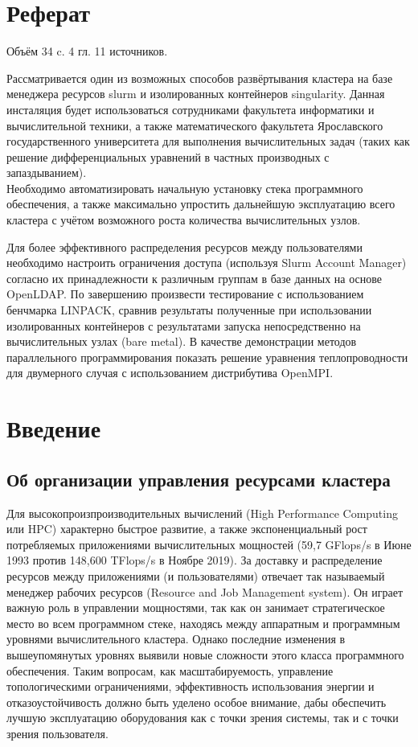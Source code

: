 \documentclass[a4paper]{extarticle}
\begin{document}
\fontsize{14}{12}\selectfont

\section*{Реферат}

Объём 34 c. 4 гл. 11 источников.

Рассматривается один из возможных способов развёртывания кластера на базе менеджера ресурсов slurm и изолированных контейнеров singularity. Данная инсталяция будет использоваться сотрудниками факультета информатики и вычислительной техники, а также математического факультета Ярославского государственного университета для выполнения вычислительных задач (таких как решение  дифференциальных уравнений в частных производных с запаздыванием).  \\ Необходимо автоматизировать начальную установку стека программного обеспечения, а также максимально упростить дальнейшую эксплуатацию всего кластера с учётом возможного роста количества
вычислительных узлов. 

Для более эффективного распределения ресурсов между пользователями необходимо настроить ограничения доступа (используя Slurm Account Manager) согласно их принадлежности к различным группам в базе данных на основе OpenLDAP. По завершению произвести тестирование с использованием бенчмарка LINPACK, сравнив результаты полученные при использовании изолированных контейнеров с результатами запуска непосредственно на вычислительных узлах (bare metal). В качестве демонстрации методов параллельного программирования показать решение уравнения теплопроводности для двумерного случая с использованием дистрибутива OpenMPI.

\clearpage

\section*{Введение}

\subsection*{Об организации управления ресурсами кластера}

Для высокопроизпроизводительных вычислений (High Performance Computing или HPC) характерно быстрое развитие, а также экспоненциальный рост потребляемых приложениями вычислительных мощностей (59,7 GFlops/s в Июне 1993 против 148,600 TFlops/s в Ноябре 2019\cite{top500}). За доставку и распределение ресурсов между приложениями (и пользователями) отвечает так называемый менеджер рабочих ресурсов (Resource and Job Management system).  Он играет важную роль в управлении мощностями, так как он занимает стратегическое место во всем программном стеке, находясь между аппаратным
и программным уровнями вычислительного кластера. Однако последние изменения в вышеупомянутых уровнях выявили новые сложности этого класса программного обеспечения. Таким вопросам, как масштабируемость, управление топологическими ограничениями, эффективность использования энергии и отказоустойчивость должно быть уделено особое внимание, дабы обеспечить лучшую эксплуатацию оборудования как с точки зрения системы, так и с точки зрения пользователя.
\end{document}
